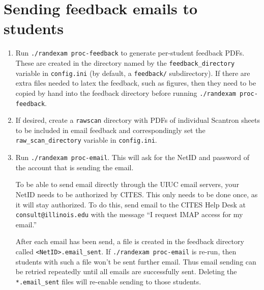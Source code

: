 \documentclass{article}
\begin{document}
\section{Sending feedback emails to students}

\begin{enumerate}
\item Run \texttt{./randexam proc-feedback} to generate per-student
  feedback PDFs. These are created in the directory named by the
  \texttt{feedback_directory} variable in \texttt{config.ini} (by
  default, a \texttt{feedback/} subdirectory). If there are extra
  files needed to latex the feedback, such as figures, then they need
  to be copied by hand into the feedback directory before running
  \texttt{./randexam proc-feedback}.
\item If desired, create a \verb+rawscan+ directory with PDFs of
  individual Scantron sheets to be included in email feedback and
  correspondingly set the \texttt{raw_scan_directory} variable in
  \texttt{config.ini}.
\item Run \texttt{./randexam proc-email}. This will ask for the NetID
  and password of the account that is sending the email.

  To be able to send email directly through the UIUC email servers,
  your NetID needs to be authorized by CITES. This only needs to be
  done once, as it will stay authorized. To do this, send email to the
  CITES Help Desk at \texttt{consult@illinois.edu} with the message
  ``I request IMAP access for my email.''

  After each email has been send, a file is created in the feedback
  directory called \texttt{<NetID>.email_sent}. If \texttt{./randexam
    proc-email} is re-run, then students with such a file won't be
  sent further email. Thus email sending can be retried repeatedly
  until all emails are successfully sent. Deleting the
  \texttt{*.email_sent} files will re-enable sending to those students.
\end{enumerate}
\end{document}
